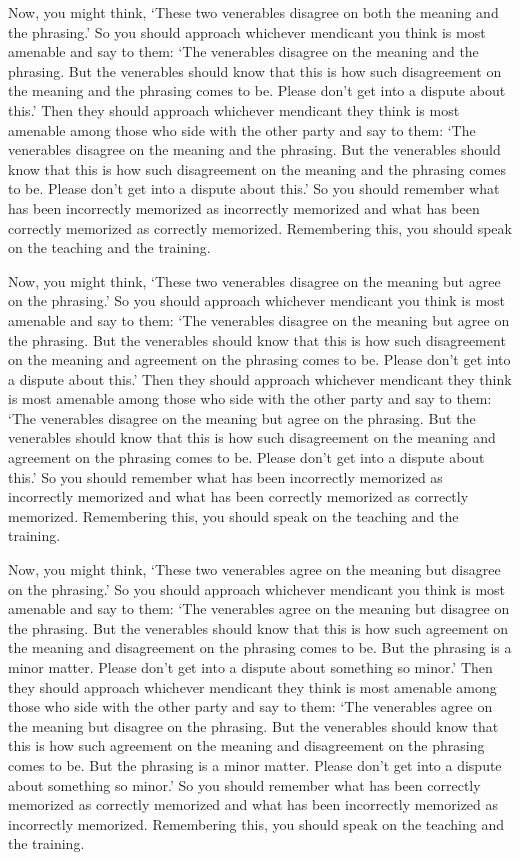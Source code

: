\documentclass[12pt,openany]{book}%
\begin{document}
Now, you might think, ‘These two venerables disagree on both the meaning and the phrasing.’ So you should approach whichever mendicant you think is most amenable and say to them: ‘The venerables disagree on the meaning and the phrasing. But the venerables should know that this is how such disagreement on the meaning and the phrasing comes to be. Please don’t get into a dispute about this.’ Then they should approach whichever mendicant they think is most amenable among those who side with the other party and say to them: ‘The venerables disagree on the meaning and the phrasing. But the venerables should know that this is how such disagreement on the meaning and the phrasing comes to be. Please don’t get into a dispute about this.’ So you should remember what has been incorrectly memorized as incorrectly memorized and what has been correctly memorized as correctly memorized. Remembering this, you should speak on the teaching and the training. 

Now, you might think, ‘These two venerables disagree on the meaning but agree on the phrasing.’ So you should approach whichever mendicant you think is most amenable and say to them: ‘The venerables disagree on the meaning but agree on the phrasing. But the venerables should know that this is how such disagreement on the meaning and agreement on the phrasing comes to be. Please don’t get into a dispute about this.’ Then they should approach whichever mendicant they think is most amenable among those who side with the other party and say to them: ‘The venerables disagree on the meaning but agree on the phrasing. But the venerables should know that this is how such disagreement on the meaning and agreement on the phrasing comes to be. Please don’t get into a dispute about this.’ So you should remember what has been incorrectly memorized as incorrectly memorized and what has been correctly memorized as correctly memorized. Remembering this, you should speak on the teaching and the training. 

Now, you might think, ‘These two venerables agree on the meaning but disagree on the phrasing.’ So you should approach whichever mendicant you think is most amenable and say to them: ‘The venerables agree on the meaning but disagree on the phrasing. But the venerables should know that this is how such agreement on the meaning and disagreement on the phrasing comes to be. But the phrasing is a minor matter. Please don’t get into a dispute about something so minor.’ Then they should approach whichever mendicant they think is most amenable among those who side with the other party and say to them: ‘The venerables agree on the meaning but disagree on the phrasing. But the venerables should know that this is how such agreement on the meaning and disagreement on the phrasing comes to be. But the phrasing is a minor matter. Please don’t get into a dispute about something so minor.’ So you should remember what has been correctly memorized as correctly memorized and what has been incorrectly memorized as incorrectly memorized. Remembering this, you should speak on the teaching and the training. 
\end{document}
